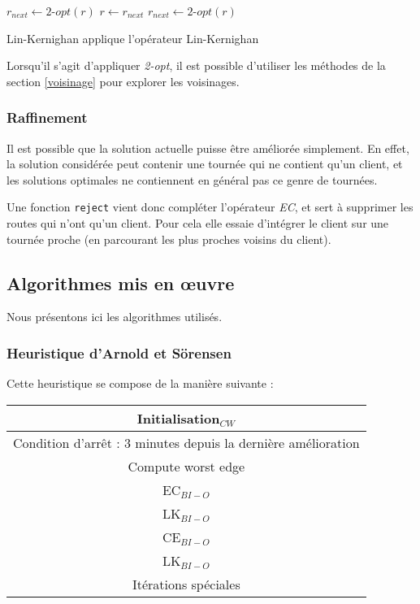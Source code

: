 \documentclass[a4paper,11pt]{article}%
\begin{document}
\begin{algorithm}
\DontPrintSemicolon %
$r_{next} \gets 2$-$opt(r) $\;
 {
  $r \gets r_{next}$\;
  $r_{next} \gets 2$-$opt(r)$\;
}
\;
\caption{{\sc Lin-Kernighan} applique l'opérateur Lin-Kernighan}
\label{algo:LK}
\end{algorithm}

Lorsqu'il s'agit d'appliquer \emph{2-opt}, il est possible d'utiliser les méthodes de la section \ref{voisinage} pour explorer les voisinages.

\subsubsection{Raffinement}

Il est possible que la solution actuelle puisse être améliorée simplement. En effet, la solution considérée peut contenir une tournée qui ne contient qu'un client, et les solutions optimales ne contiennent en général pas ce genre de tournées.  

Une fonction \lstinline|reject| vient donc compléter l'opérateur \emph{EC}, et sert à supprimer les routes qui n'ont qu'un client. Pour cela elle essaie d'intégrer le client sur une tournée proche (en parcourant les plus proches voisins du client).

\subsection{Algorithmes mis en œuvre}
Nous présentons ici les algorithmes utilisés.
\subsubsection{Heuristique d'Arnold et Sörensen}

Cette heuristique se compose de la manière suivante :


\begin{center}
\begin{tabular}{|c|}

   \hline
   Initialisation$_{CW}$  \\
   \hline
   \hline
   Condition d'arrêt : 3 minutes depuis la dernière amélioration  \\
   \hline
   Compute worst edge \\
   \hline
   EC$_{BI-O}$ \\
   \hline
   LK$_{BI-O}$ \\
   \hline
   CE$_{BI-O}$ \\
   \hline
   LK$_{BI-O}$ \\
   \hline
   Itérations spéciales \\
   \hline
   \hline
   
\end{tabular}
\end{center}
\end{document}
